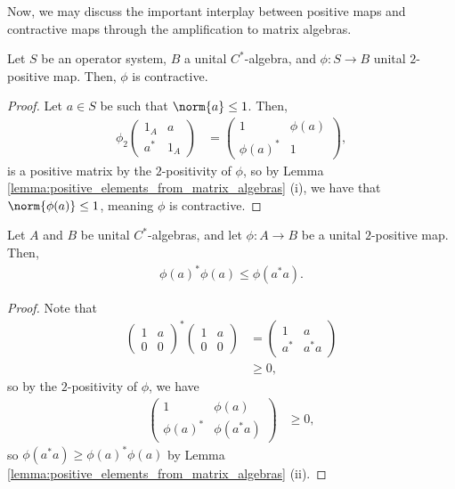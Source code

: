 Now, we may discuss the important interplay between positive maps and contractive maps through the amplification to matrix algebras.
\begin{proposition}\label{prop:two_positive_contractive}
  Let $S$ be an operator system, $B$ a unital $C^{\ast}$-algebra, and $\phi\colon S\rightarrow B$ unital $2$-positive map. Then, $\phi$ is contractive.
\end{proposition}
\begin{proof}
  Let $a\in S$ be such that $\norm{a}\leq 1$. Then,
  \begin{align*}
    \phi_2 \begin{pmatrix}1_A & a \\ a^{\ast} & 1_A\end{pmatrix} &= \begin{pmatrix} 1 & \phi\left( a \right) \\ \phi\left( a \right)^{\ast} & 1\end{pmatrix},
  \end{align*}
  is a positive matrix by the $2$-positivity of $\phi$, so by Lemma \ref{lemma:positive_elements_from_matrix_algebras} (i), we have that $\norm{\phi(a)}\leq 1$, meaning $\phi$ is contractive.
\end{proof}
\begin{proposition}
  Let $A$ and $B$ be unital $C^{\ast}$-algebras, and let $\phi\colon A\rightarrow B$ be a unital $2$-positive map. Then,
  \begin{align*}
    \phi\left( a \right)^{\ast}\phi\left( a \right)\leq \phi\left( a^{\ast}a \right).
  \end{align*}
\end{proposition}
\begin{proof}
  Note that
  \begin{align*}
    \begin{pmatrix}1 & a \\ 0 & 0\end{pmatrix}^{\ast} \begin{pmatrix}1 & a \\ 0 & 0\end{pmatrix} &= \begin{pmatrix}1 & a \\ a^{\ast} & a^{\ast}a\end{pmatrix}\\
                     &\geq 0,
  \end{align*}
  so by the $2$-positivity of $\phi$, we have
  \begin{align*}
    \begin{pmatrix}1 & \phi\left( a \right) \\ \phi\left( a \right)^{\ast} & \phi\left( a^{\ast}a \right)\end{pmatrix} &\geq 0,
  \end{align*}
  so $\phi\left( a^{\ast}a \right) \geq \phi\left( a \right)^{\ast}\phi\left( a \right)$ by Lemma \ref{lemma:positive_elements_from_matrix_algebras} (ii).
\end{proof}
